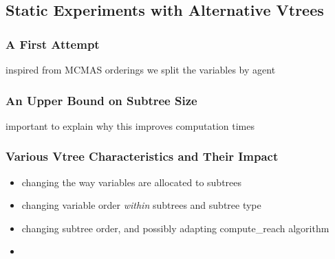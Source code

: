 \documentclass[11pt]{article}
\begin{document}
\subsection{Static Experiments with Alternative Vtrees}

\subsubsection{A First Attempt}

inspired from MCMAS orderings we split the variables by agent

\subsubsection{An Upper Bound on Subtree Size}

important to explain why this improves computation times

\subsubsection{Various Vtree Characteristics and Their Impact}

\begin{itemize}
\item changing the way variables are allocated to subtrees
\item changing variable order \textit{within} subtrees and subtree type
\item changing subtree order, and possibly adapting compute\_reach algorithm
\item 

\end{itemize}
\end{document}
